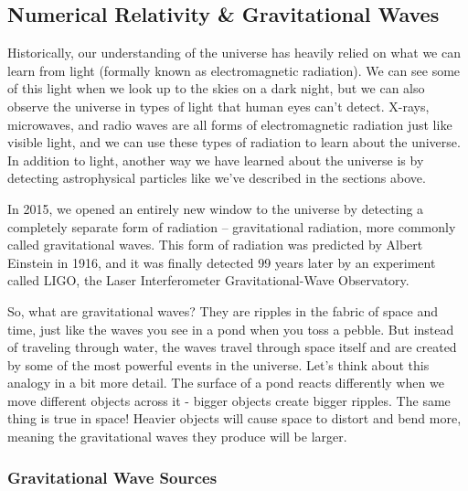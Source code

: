 \subsection{Numerical Relativity \& Gravitational Waves}

Historically, our understanding of the universe has heavily relied on what we can learn from light (formally known as electromagnetic radiation). We can see some of this light when we look up to the skies on a dark night, but we can also observe the universe in types of light that human eyes can't detect. X-rays, microwaves, and radio waves are all forms of electromagnetic radiation just like visible light, and we can use these types of radiation to learn about the universe. In addition to light, another way we have learned about the universe is by detecting astrophysical particles like we've described in the sections above. 

In 2015, we opened an entirely new window to the universe by detecting a completely separate form of radiation -- gravitational radiation, more commonly called gravitational waves. This form of radiation was predicted by Albert Einstein in 1916, and it was finally detected 99 years later by an experiment called LIGO, the Laser Interferometer Gravitational-Wave Observatory.

So, what are gravitational waves? They are ripples in the fabric of space and time, just like the waves you see in a pond when you toss a pebble. But instead of traveling through water, the waves travel through space itself and are created by some of the most powerful events in the universe. Let's think about this analogy in a bit more detail. The surface of a pond reacts differently when we move different objects across it - bigger objects create bigger ripples. The same thing is true in space! Heavier objects will cause space to distort and bend more, meaning the gravitational waves they produce will be larger.


\subsubsection{Gravitational Wave Sources}


